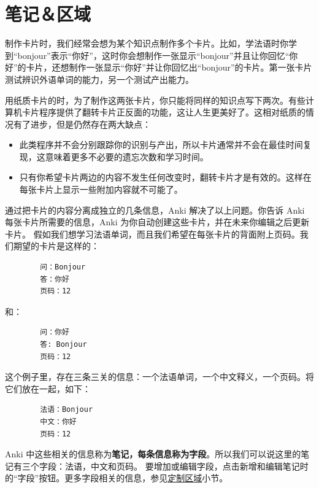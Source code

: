 \documentclass[a4paper]{book}
\begin{document}
	\section{笔记＆区域}
	
	制作卡片时，我们经常会想为某个知识点制作多个卡片。比如，学法语时你学到“bonjour”表示“你好”，这时你会想制作一张显示“bonjour”并且让你回忆“你好”的卡片，还想制作一张显示“你好”并让你回忆出“bonjour”的卡片。第一张卡片测试辨识外语单词的能力，另一个测试产出能力。
	
	用纸质卡片的时，为了制作这两张卡片，你只能将同样的知识点写下两次。有些计算机卡片程序提供了翻转卡片正反面的功能，这让人生更美好了。这相对纸质的情况有了进步，但是仍然存在两大缺点：
	
	\begin{itemize}
		\itemsep1pt\parskip0pt
		\item 此类程序并不会分别跟踪你的识别与产出，所以卡片通常并不会在最佳时间复现，这意味着更多不必要的遗忘次数和学习时间。
		\item 只有你希望卡片两边的内容不发生任何改变时，翻转卡片才是有效的。这样在每张卡片上显示一些附加内容就不可能了。
	\end{itemize}
	
	通过把卡片的内容分离成独立的几条信息，Anki 解决了以上问题。你告诉 Anki 每张卡片所需要的信息，Anki 为你自动创建这些卡片，并在未来你编辑之后更新卡片。
	假如我们想学习法语单词，而且我们希望在每张卡片的背面附上页码。我们期望的卡片是这样的：
	
	\begin{shaded}\begin{verbatim}
		问：Bonjour
		答：你好
		页码：12
		\end{verbatim}\end{shaded}
	
	和：
	\begin{shaded}\begin{verbatim}
		问：你好
		答: Bonjour
		页码：12
		\end{verbatim}\end{shaded}
	
	这个例子里，存在三条三关的信息：一个法语单词，一个中文释义，一个页码。将它们放在一起，如下：
	
	\begin{shaded}\begin{verbatim}
		法语：Bonjour
		中文：你好
		页码：12
		\end{verbatim}\end{shaded}
	
	Anki 中这些相关的信息称为\textbf{笔记，每条信息称为字段}。所以我们可以说这里的笔记有三个字段：法语，中文和页码。
	要增加或编辑字段，点击新增和编辑笔记时的“字段”按钮。更多字段相关的信息，参见\hyperref[fields]{定制区域}小节。
	
\end{document}
